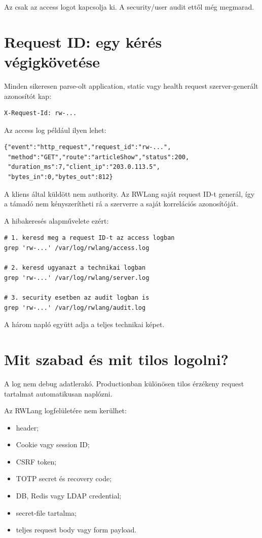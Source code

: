 Az  csak az access logot kapcsolja ki. A security/user audit ettől még megmarad.

\section{Request ID: egy kérés végigkövetése}

Minden sikeresen parse-olt application, static vagy health request szerver-generált azonosítót kap:

\begin{lstlisting}
X-Request-Id: rw-...
\end{lstlisting}

Az access log például ilyen lehet:

\begin{lstlisting}
{"event":"http_request","request_id":"rw-...",
 "method":"GET","route":"articleShow","status":200,
 "duration_ms":7,"client_ip":"203.0.113.5",
 "bytes_in":0,"bytes_out":812}
\end{lstlisting}

A kliens által küldött  nem authority. Az RWLang saját request ID-t generál, így a támadó nem kényszerítheti rá a szerverre a saját korrelációs azonosítóját.

A hibakeresés alapművelete ezért:

\begin{lstlisting}
# 1. keresd meg a request ID-t az access logban
grep 'rw-...' /var/log/rwlang/access.log

# 2. keresd ugyanazt a technikai logban
grep 'rw-...' /var/log/rwlang/server.log

# 3. security esetben az audit logban is
grep 'rw-...' /var/log/rwlang/audit.log
\end{lstlisting}

A három napló együtt adja a teljes technikai képet.

\section{Mit szabad és mit tilos logolni?}

A log nem debug adatlerakó. Productionban különösen tilos érzékeny request tartalmat automatikusan naplózni.

Az RWLang logfelületére nem kerülhet:

\begin{itemize}
  \item {} header;
  \item Cookie vagy session ID;
  \item CSRF token;
  \item TOTP secret és recovery code;
  \item DB, Redis vagy LDAP credential;
  \item secret-file tartalma;
  \item teljes request body vagy form payload.
\end{itemize}

